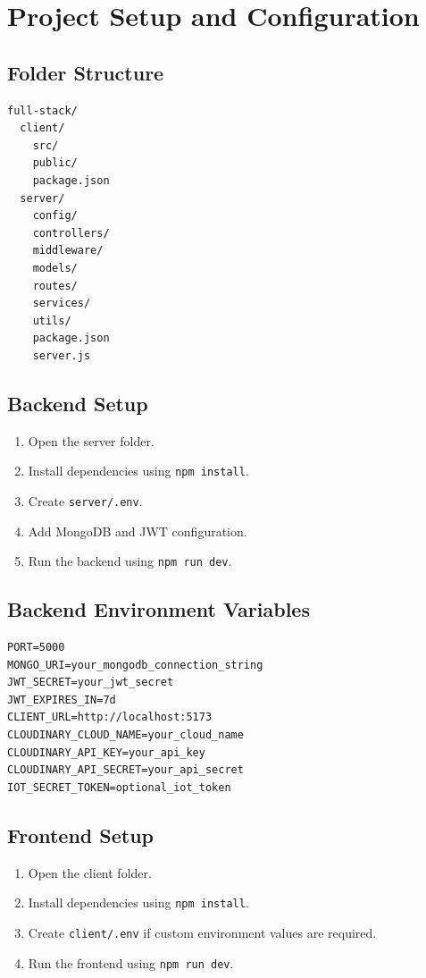\documentclass[12pt,a4paper]{article}
\begin{document}
\section{Project Setup and Configuration}

\subsection{Folder Structure}

\begin{verbatim}
full-stack/
  client/
    src/
    public/
    package.json
  server/
    config/
    controllers/
    middleware/
    models/
    routes/
    services/
    utils/
    package.json
    server.js
\end{verbatim}

\subsection{Backend Setup}

\begin{enumerate}
  \item Open the server folder.
  \item Install dependencies using \texttt{npm install}.
  \item Create \texttt{server/.env}.
  \item Add MongoDB and JWT configuration.
  \item Run the backend using \texttt{npm run dev}.
\end{enumerate}

\subsection{Backend Environment Variables}

\begin{verbatim}
PORT=5000
MONGO_URI=your_mongodb_connection_string
JWT_SECRET=your_jwt_secret
JWT_EXPIRES_IN=7d
CLIENT_URL=http://localhost:5173
CLOUDINARY_CLOUD_NAME=your_cloud_name
CLOUDINARY_API_KEY=your_api_key
CLOUDINARY_API_SECRET=your_api_secret
IOT_SECRET_TOKEN=optional_iot_token
\end{verbatim}

\subsection{Frontend Setup}

\begin{enumerate}
  \item Open the client folder.
  \item Install dependencies using \texttt{npm install}.
  \item Create \texttt{client/.env} if custom environment values are required.
  \item Run the frontend using \texttt{npm run dev}.
\end{enumerate}
\end{document}
